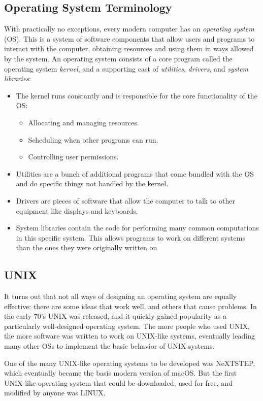 \documentclass[aps,showpacs,prd,notitlepage,preprintnumbers,amsmath,amssymb,letterpaper]{revtex4}
\begin{document}
\subsection{Operating System Terminology}
With practically no exceptions, every modern computer has an \textit{operating system} (OS).
This is a system of software components that allow users and programs to interact with the computer, obtaining resources and using them in ways allowed by the system.
An operating system consists of a core program called the operating system \textit{kernel}, and a supporting cast of \textit{utilities}, \textit{drivers}, and \textit{system libraries}:
\begin{itemize}
  \item The kernel runs constantly and is responsible for the core functionality of the OS:\@
        \begin{itemize}
          \item Allocating and managing resources.
          \item Scheduling when other programs can run.
          \item Controlling user permissions.
        \end{itemize}
  \item Utilities are a bunch of additional programs that come bundled with the OS and do specific things not handled by the kernel.
  \item Drivers are pieces of software that allow the computer to talk to other equipment like displays and keyboards.
  \item System libraries contain the code for performing many common computations in this specific system. This allows programs to work on different systems than the ones they were originally written on
\end{itemize}
\subsection{UNIX}
It turns out that not all ways of designing an operating system are equally effective: there are some ideas that work well, and others that cause problems.
In the early 70's UNIX was released, and it quickly gained popularity as a particularly well-designed operating system.
The more people who used UNIX, the more software was written to work on UNIX-like systems, eventually leading many other OSs to implement the basic behavior of UNIX systems.

One of the many UNIX-like operating systems to be developed was NeXTSTEP, which eventually became the basis modern version of macOS.
But the first UNIX-like operating system that could be downloaded, used for free, and modified by anyone was LINUX.
\end{document}
